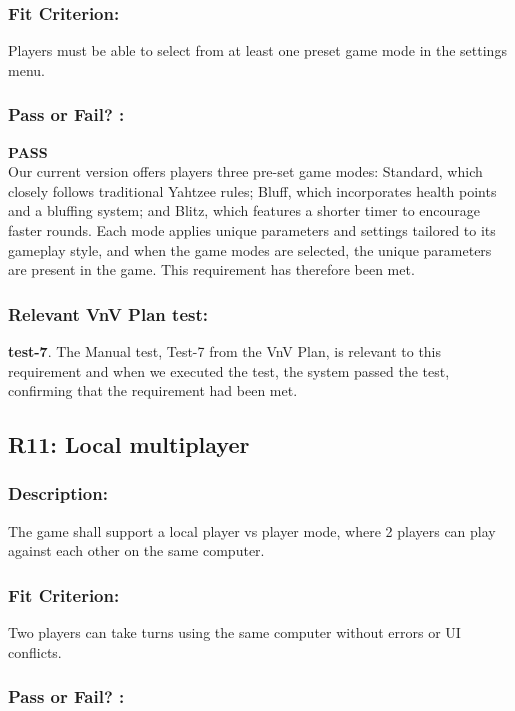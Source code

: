 \documentclass[12pt, titlepage]{article}
\begin{document}
\subsubsection*{Fit Criterion:}Players must be able to select from at least one preset game mode in the settings menu.

\subsubsection*{Pass or Fail? :} 

 \noindent \textbf{PASS}\\
 
  Our current version offers players three pre-set game modes: Standard, which closely follows traditional Yahtzee rules; Bluff, which incorporates health points and a bluffing system; and Blitz, which features a shorter timer to encourage faster rounds. Each mode applies unique parameters and settings tailored to its gameplay style, and when the game modes are selected, the unique parameters are present in the game. This requirement has therefore been met.

\subsubsection*{Relevant VnV Plan test: } \textbf{test-7}.  The Manual test, Test-7 from the VnV Plan, is relevant to this requirement and when we executed the test, the system passed the test, confirming that the requirement had been met.


\subsection{R11: Local multiplayer} 
\label{R11} 

\subsubsection*{Description:}The game shall support a local player vs player mode, where 2 players can play against each other on the same computer.

\subsubsection*{Fit Criterion:}Two players can take turns using the same computer without errors or UI conflicts.

\subsubsection*{Pass or Fail? :} 
\end{document}
